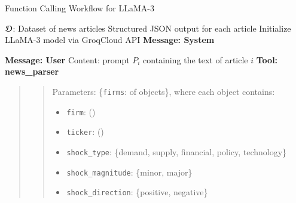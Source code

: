 
\begin{algorithm}[H]
\caption{Function Calling Workflow for LLaMA-3}
\label{alg:function_calling}
\begin{algorithmic}[1]
\Require $\mathcal{D}$: Dataset of news articles
\Ensure Structured JSON output for each article
\State Initialize LLaMA-3 model via GroqCloud API
 \Comment{\scalebox{0.9}{\textcolor{lightgray}{Iterate over each article in the dataset}}}
    \State \textbf{Message: System} \Comment{\scalebox{0.9}{\textcolor{lightgray}{Define the role and task for the LLM}}}

		\begin{quote}
		\end{quote}


    \State \textbf{Message: User} \Comment{\scalebox{0.9}{\textcolor{lightgray}{User provides the article text as input}}}
    \Statex \hspace{1cm} Content: prompt $P_i$ containing the text of article $i$
    \State \textbf{Tool: news\_parser} 
%    
\begin{quote}
\begin{quote}
Parameters: \{\texttt{firms}:  of objects\}, where each object contains:
            \begin{itemize}
                \item \texttt{firm}: \hspace{2.1cm}  ()
                \item \texttt{ticker}: \hspace{1.7cm}  ()
                \item \texttt{shock\_type}: \hspace{0.9cm}  \{demand, supply, financial, policy, technology\}
                \item \texttt{shock\_magnitude}:  \hspace{0cm} \{minor, major\}
                \item \texttt{shock\_direction}: \hspace{0cm} \{positive, negative\}
            \end{itemize} 
\end{quote} 
\end{quote} 
 

\end{algorithmic}
\end{algorithm}
